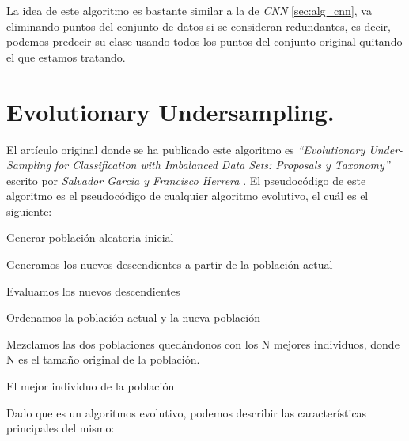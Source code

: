 La idea de este algoritmo es bastante similar a la de \textit{CNN} \ref{sec:alg_cnn}, va eliminando puntos del conjunto de datos si se consideran redundantes, es decir, podemos predecir su clase usando todos los puntos del conjunto original quitando el que estamos tratando.

\section{Evolutionary Undersampling.} \label{sec:alg_eus}
El artículo original donde se ha publicado este algoritmo es \textit{``Evolutionary Under-Sampling for Classification with Imbalanced Data Sets: Proposals y Taxonomy''} escrito por \textit{Salvador Garcia y Francisco Herrera} \cite{eus}. El pseudocódigo de este algoritmo es el pseudocódigo de cualquier algoritmo evolutivo, el cuál es el siguiente:

\begin{codigo}
\begin{algorithmic}[1]
\State Generar población aleatoria inicial
\State \parbox[t]{305pt}{Generamos los nuevos descendientes a partir de la población actual\strut}
\State \parbox[t]{305pt}{Evaluamos los nuevos descendientes\strut}
\State \parbox[t]{305pt}{Ordenamos la población actual y la nueva población\strut}
\State \parbox[t]{305pt}{Mezclamos las dos poblaciones quedándonos con los N mejores individuos, donde N es el tamaño original de la población.\strut}
\EndWhile
\State \Return El mejor individuo de la población
\EndFunction 
\end{algorithmic}
\end{codigo}

Dado que es un algoritmos evolutivo, podemos describir las características principales del mismo:

